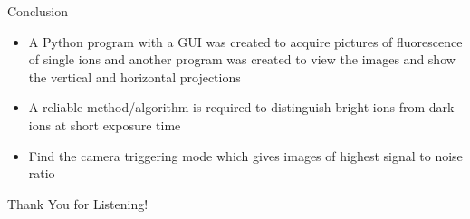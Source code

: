 \documentclass{beamer}
\begin{document}
\begin{frame}{Conclusion}

\begin{itemize}
\item A Python program with a GUI was created to acquire pictures of fluorescence of single ions and another program was created to view the images and show the vertical and horizontal projections
\bigskip
\item A reliable method/algorithm is required to distinguish bright ions from dark ions at short exposure time
\bigskip
\item Find the camera triggering mode which gives images of highest signal to noise ratio

\end{itemize}


\end{frame}

\begin{frame}[noframenumbering]

\centering
Thank You for Listening!



\end{frame}


\end{document}
